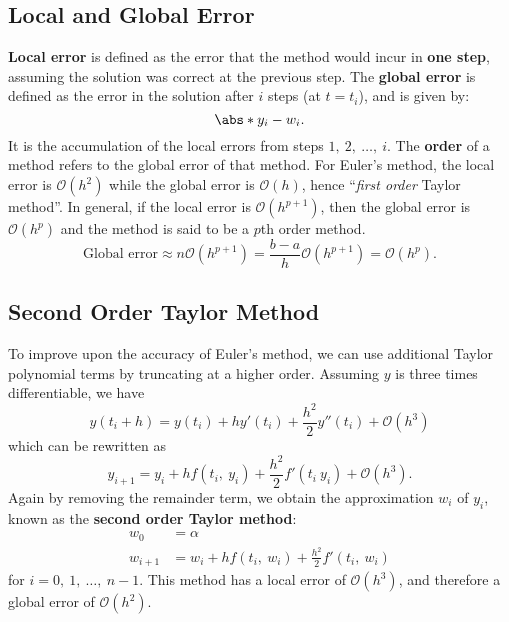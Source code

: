 \documentclass{article}
\begin{document}
\subsection{Local and Global Error}
\textbf{Local error} is defined as the error that the method would incur
in \textbf{one step}, assuming the solution was correct at the previous
step. The \textbf{global error} is defined as the error in the solution
after \(i\) steps (at \(t = t_i\)), and is given by:
\begin{equation*}
    \abs*{y_i - w_i}.
\end{equation*}
It is the accumulation of the local errors from steps
\(1,\: 2,\: \ldots,\: i\). The \textbf{order} of a method refers to the
global error of that method. For Euler's method, the local error is
\(\mathcal{O}\left( h^2 \right)\) while the global error is
\(\mathcal{O}\left( h \right)\), hence ``\textit{first order} Taylor
method''. In general, if the local error is
\(\mathcal{O}\left( h^{p + 1} \right)\), then the global error is
\(\mathcal{O}\left( h^p \right)\) and the method is said to be a \(p\)th
order method.
\begin{equation*}
    \text{Global error} \approx n \mathcal{O}\left( h^{p + 1} \right) = \frac{b - a}{h} \mathcal{O}\left( h^{p + 1} \right) = \mathcal{O}\left( h^p \right).
\end{equation*}
\subsection{Second Order Taylor Method}
To improve upon the accuracy of Euler's method, we can use additional
Taylor polynomial terms by truncating at a higher order. Assuming \(y\)
is three times differentiable, we have
\begin{equation*}
    y\left( t_i + h \right) = y\left( t_i \right) + h y'\left( t_i \right) + \frac{h^2}{2} y''\left( t_i \right) + \mathcal{O}\left( h^3 \right)
\end{equation*}
which can be rewritten as
\begin{equation*}
    y_{i + 1} = y_i + h f\left( t_i,\: y_i \right) + \frac{h^2}{2} f'\left( t_i\: y_i \right) + \mathcal{O}\left( h^3 \right).
\end{equation*}
Again by removing the remainder term, we obtain the approximation \(w_i\) of \(y_i\), known as the \textbf{second order Taylor method}:
\begin{align*}
    w_0       & = \alpha                                                                         \\
    w_{i + 1} & = w_i + h f\left( t_i,\: w_i \right) + \frac{h^2}{2} f'\left( t_i,\: w_i \right)
\end{align*}
for \(i = 0,\: 1,\: \ldots,\: n - 1\).
This method has a local error of \(\mathcal{O}\left( h^3 \right)\), and
therefore a global error of \(\mathcal{O}\left( h^2 \right)\).
\end{document}
